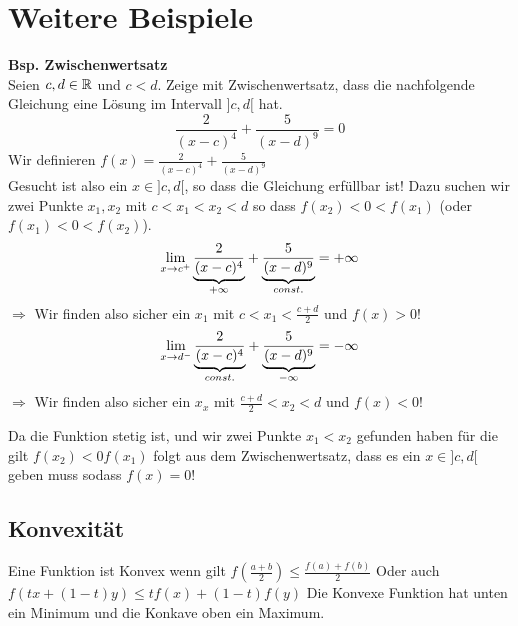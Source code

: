 \section{Weitere Beispiele}
\begin{footnotesize}
\textbf{Bsp. Zwischenwertsatz}\\
Seien $c, d \in \mathbb{R}$ und $c < d$. Zeige mit Zwischenwertsatz, dass die nachfolgende Gleichung eine Lösung im Intervall $]c, d[$ hat.
\[
	\frac{2}{(x - c)^4} + \frac{5}{(x - d)^9} = 0
\]
Wir definieren $f(x) = \frac{2}{(x - c)^4} + \frac{5}{(x - d)^9}$\\
Gesucht ist also ein $x \in ]c, d[$, so dass die Gleichung erfüllbar ist! 
Dazu suchen wir zwei Punkte $x_1, x_2$ mit $c < x_1 < x_2 < d$ so dass $f(x_2) < 0 < f(x_1)$   (oder $f(x_1) < 0 < f(x_2)$).
\[
	\lim_{x \to c^{+}} \underset{+ \infty}{\underbrace{\frac{2}{(x - c)^4}}} + \underset{const.}{\underbrace{\frac{5}{(x - d)^9}}} = + \infty
\]
$\Rightarrow$ Wir finden also sicher ein $x_1$ mit $c < x_1 < \frac{c + d}{2}$ und $f(x) > 0$!
\[
	\lim_{x \to d^{-}} \underset{const.}{\underbrace{\frac{2}{(x - c)^4}}} + \underset{- \infty}{\underbrace{\frac{5}{(x - d)^9}}} = - \infty
\]
$\Rightarrow$ Wir finden also sicher ein $x_x$ mit $\frac{c + d}{2} < x_2 < d$ und $f(x) < 0$!

Da die Funktion stetig ist, und wir zwei Punkte $x_1 < x_2$ gefunden haben für die gilt $f(x_2) < 0 f(x_1)$ folgt aus dem Zwischenwertsatz, dass es ein $x \in ]c, d[$ geben muss sodass $f(x) = 0$!
\end{footnotesize}
\subsection{Konvexität}
Eine Funktion ist Konvex wenn gilt $f(\frac{a+b}{2}) \leq \frac{f(a) + f(b)}{2}$
Oder auch
$f(tx +(1-t)y) \leq tf(x) + (1-t) f(y)$
Die Konvexe Funktion hat unten ein Minimum und die Konkave oben ein Maximum. 

